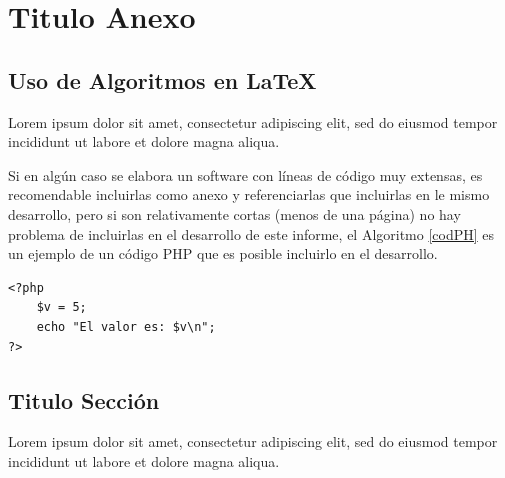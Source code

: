 \documentclass[letter,12pt]{report}
\begin{document}
\renewcommand{\appendixname}{Anexos}
\appendix
\chapter{Titulo Anexo}
\section{Uso de Algoritmos en \LaTeX{}}\label{A:01}
Lorem ipsum dolor sit amet, consectetur adipiscing elit, sed do eiusmod tempor incididunt ut labore et dolore magna aliqua.

Si en algún caso se elabora un software con líneas de código muy extensas, es recomendable incluirlas como anexo y referenciarlas que incluirlas en le mismo desarrollo, pero si son relativamente cortas (menos de una página) no hay problema de incluirlas en el desarrollo de este informe, el Algoritmo \ref{codPH} es un ejemplo de un código PHP que es posible incluirlo en el desarrollo.

\lstset{language=PHP} %
\begin{lstlisting}[caption= C\'odigo PHP de impresi\'on de una variable, label = codPH]
<?php
    $v = 5;
    echo "El valor es: $v\n";
?>
\end{lstlisting}


\section{Titulo Sección}
Lorem ipsum dolor sit amet, consectetur adipiscing elit, sed do eiusmod tempor incididunt ut labore et dolore magna aliqua.
\end{document}
